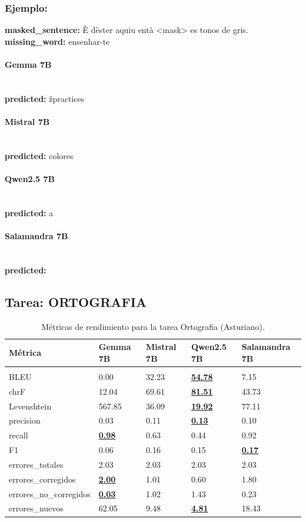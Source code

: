 \subsubsection{Ejemplo:}
\textbf{masked\_sentence:} È d\textquotesingle{}èster aquiu entà {\textless}mask{\textgreater} es tonos de gris.\\
\textbf{missing\_word:} ensenhar-te

\paragraph{Gemma 7B}~\\
\textbf{predicted:} žpractices

\paragraph{Mistral 7B}~\\
\textbf{predicted:} colores

\paragraph{Qwen2.5 7B}~\\
\textbf{predicted:} a

\paragraph{Salamandra 7B}~\\
\textbf{predicted:} 

\subsection{Tarea: ORTOGRAFIA}\label{tarea-ortografia}
\begin{longtable}[]{@{}lllll@{}}
\toprule\noalign{}
Métrica & Gemma 7B & Mistral 7B & Qwen2.5 7B & Salamandra 7B \\
\midrule\noalign{}
\endhead
\bottomrule\noalign{}
\caption{Métricas de rendimiento para la tarea Ortografia (Asturiano).}
\label{tab:metricas_ortografia_Asturiano}\\
\endlastfoot
BLEU & 0.00 & 32.23 & \textbf{\underline{54.78}} & 7.15 \\
chrF & 12.04 & 69.61 & \textbf{\underline{81.51}} & 43.73 \\
Levenshtein & 567.85 & 36.09 & \textbf{\underline{19.92}} & 77.11 \\
precision & 0.03 & 0.11 & \textbf{\underline{0.13}} & 0.10 \\
recall & \textbf{\underline{0.98}} & 0.63 & 0.44 & 0.92 \\
F1 & 0.06 & 0.16 & 0.15 & \textbf{\underline{0.17}} \\
errores\_totales & 2.03 & 2.03 & 2.03 & 2.03 \\
errores\_corregidos & \textbf{\underline{2.00}} & 1.01 & 0.60 & 1.80 \\
errores\_no\_corregidos & \textbf{\underline{0.03}} & 1.02 & 1.43 & 0.23 \\
errores\_nuevos & 62.05 & 9.48 & \textbf{\underline{4.81}} & 18.43 \\
\end{longtable}

